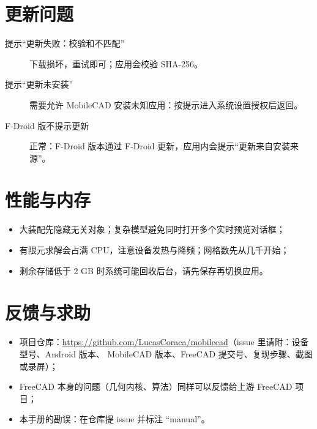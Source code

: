 \section{更新问题}

\begin{description}
  \item[提示“更新失败：校验和不匹配”] 下载损坏，重试即可；应用会校验 SHA-256。
  \item[提示“更新未安装”] 需要允许 MobileCAD 安装未知应用：按提示进入系统设置授权后返回。
  \item[F-Droid 版不提示更新] 正常：F-Droid 版本通过 F-Droid 更新，应用内会提示“更新来自安装来源”。
\end{description}

\section{性能与内存}

\begin{itemize}
  \item 大装配先隐藏无关对象；复杂模型避免同时打开多个实时预览对话框；
  \item 有限元求解会占满 CPU，注意设备发热与降频；网格数先从几千开始；
  \item 剩余存储低于 2 GB 时系统可能回收后台，请先保存再切换应用。
\end{itemize}

\section{反馈与求助}

\begin{itemize}
  \item 项目仓库：\url{https://github.com/LucasCoraca/mobilecad}（issue 里请附：设备型号、Android 版本、
        MobileCAD 版本、FreeCAD 提交号、复现步骤、截图或录屏）；
  \item FreeCAD 本身的问题（几何内核、算法）同样可以反馈给上游 FreeCAD 项目；
  \item 本手册的勘误：在仓库提 issue 并标注 “manual”。
\end{itemize}
